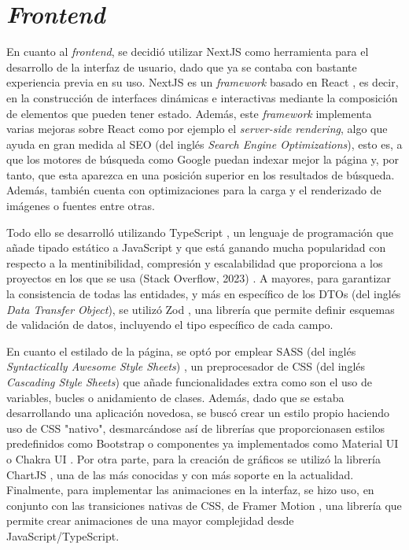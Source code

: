 \section{\textit{Frontend}}
\label{sec:herramientas_frontend}

En cuanto al \textit{frontend}, se decidió utilizar NextJS \cite{nextjs} como herramienta para el desarrollo de la interfaz de usuario, dado que ya
se contaba con bastante experiencia previa en su uso. NextJS es un \textit{framework} basado en React \cite{react}, es decir, en la construcción de interfaces dinámicas e interactivas mediante la composición
de elementos que pueden tener estado. Además, este \textit{framework} implementa varias mejoras sobre React como por ejemplo el \textit{server-side rendering}, algo que ayuda en gran medida
al SEO (del inglés \textit{Search Engine Optimizations}), esto es, a que los motores de búsqueda como Google puedan indexar mejor la página y, por tanto, que esta aparezca en una posición superior en los resultados de búsqueda.
Además, también cuenta con optimizaciones para la carga y el renderizado de imágenes o fuentes entre otras.

\bigskip
Todo ello se desarrolló utilizando TypeScript \cite{typescript}, un lenguaje de programación que añade tipado estático a JavaScript
y que está ganando mucha popularidad con respecto a la mentinibilidad, compresión y escalabilidad que proporciona a los proyectos en los que se usa (Stack Overflow, 2023) \cite{stackoverflow2023}.
A mayores, para garantizar la consistencia de todas las entidades, y más en específico de los DTOs (del inglés \textit{Data Transfer Object}), se utilizó Zod \cite{zod}, una librería que permite
definir esquemas de validación de datos, incluyendo el tipo específico de cada campo.

\bigskip
En cuanto el estilado de la página, se optó por emplear SASS (del inglés \textit{Syntactically Awesome Style Sheets}) \cite{sass}, un preprocesador de CSS (del inglés \textit{Cascading Style Sheets}) que añade
funcionalidades extra como son el uso de variables, bucles o anidamiento de clases. Además, dado que se estaba desarrollando
una aplicación novedosa, se buscó crear un estilo propio haciendo uso de CSS "nativo", desmarcándose así de librerías que proporcionasen estilos predefinidos como Bootstrap \cite{bootstrap} o componentes ya implementados
como Material UI \cite{materialui} o Chakra UI \cite{chakraui}. Por otra parte, para la creación de gráficos se utilizó la librería ChartJS \cite{chartjs}, una de las más conocidas
y con más soporte en la actualidad. Finalmente, para implementar las animaciones en la interfaz, se hizo uso, en conjunto con las transiciones nativas
de CSS, de Framer Motion \cite{framermotion}, una librería que permite crear animaciones de una mayor complejidad desde JavaScript/TypeScript. 

